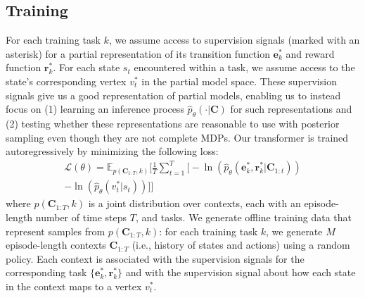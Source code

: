 \documentclass[sigconf]{aamas}
\begin{document}
\subsection{Training}
For each training task $k$, we assume access to supervision signals (marked with an asterisk) for a partial representation of its transition function $\mathbf{e}_k^*$ and reward function $\mathbf{r}_k^*$. For each state $s_t$ encountered within a task, we assume access to the state's corresponding vertex $v_t^*$ in the partial model space. These supervision signals give us a good representation of partial models, enabling us to instead focus on (1) learning an inference process $\hat{p}_\theta(\cdot|\mathbf{C})$ for such representations and (2) testing whether these representations are reasonable to use with posterior sampling even though they are not complete MDPs. Our transformer is trained autoregressively by minimizing the following loss:
\begin{align*}
  \mathcal{L}(\theta) = \mathbb{E}_{p(\mathbf{C}_{1:T}, k)} \bigg[ \frac{1}{T}\sum_{t=1}^{T} \big[ - \ln(\hat{p}_\theta(\mathbf{e}^*_k, \mathbf{r}_{k}^*|\mathbf{C}_{1:t})) \\
  - \ln(\hat{p}_\theta(v_t^*|s_t)) \big] \bigg]
\end{align*}
where $p(\mathbf{C}_{1:T}, k)$ is a joint distribution over contexts, each with an episode-length number of time steps $T$, and tasks.
We generate offline training data that represent samples from $p(\mathbf{C}_{1:T}, k)$: for each training task $k$, we generate $M$ episode-length contexts $\mathbf{C}_{1:T}$ (i.e., history of states and actions) using a random policy. Each context is associated with the supervision signals for the corresponding task $\{\mathbf{e}^*_k, \mathbf{r}_{k}^*\}$ and with the supervision signal about how each state in the context maps to a vertex $v_t^*$.
\end{document}
